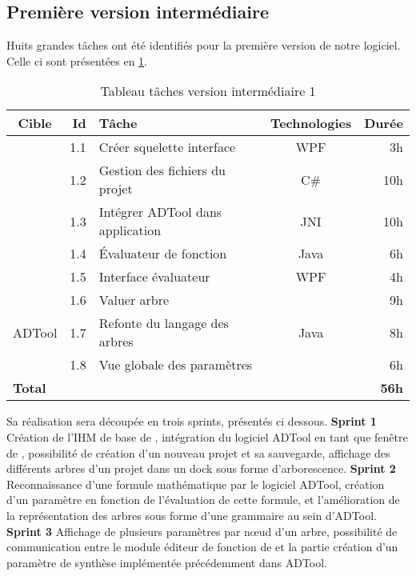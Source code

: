 	\subsection{Première version intermédiaire}
		Huits grandes tâches ont été identifiés pour la première version de notre logiciel. Celle ci sont présentées en \ttable{} \ref{tab:taches_units_1}. 
		\begin{table}[H]
			\centering
			\begin{tabular}{|c|r|l|c|r|}
				\hline
				\textbf{Cible} & \textbf{Id} & \textbf{Tâche} & \textbf{Technologies} & \textbf{Durée}\\
				\hline

				\multirow{5}{*}{\glasir{}} & 1.1 & Créer squelette interface & WPF & 3h\\
				\cline{2-5}
				 & 1.2 & Gestion des fichiers du projet & C\# & 10h\\
				\cline{2-5}
				 & 1.3 & Intégrer ADTool dans application & JNI & 10h\\
				\cline{2-5}
				 & 1.4 & \'Evaluateur de fonction & Java & 6h\\
				\cline{2-5}
				 & 1.5 & Interface évaluateur & WPF & 4h\\
				\hline

				\multirow{3}{*}{ADTool} & 1.6 & Valuer arbre & \multirow{3}{*}{Java} & 9h\\
				\cline{2-3} \cline{5-5}
				 & 1.7 & Refonte du langage des arbres & & 8h\\
				\cline{2-3} \cline{5-5}
				 & 1.8 & Vue globale des paramètres & & 6h\\
				\hline

				\multicolumn{4}{|l|}{\bf Total} & {\bf 56h}\\
				\hline
			\end{tabular}
			\caption{Tableau tâches version intermédiaire 1}
			\label{tab:taches_units_1}
		\end{table}
		Sa réalisation sera découpée en trois sprints, présentés ci dessous.\newline
		\textbf{Sprint 1} Création de l'IHM de base de \glasir{}, intégration du logiciel ADTool en tant que fenêtre de \glasir{}, possibilité de création d'un nouveau projet et sa sauvegarde, affichage des différents arbres d'un projet dans un dock sous forme d'arborescence.\newline
		\textbf{Sprint 2} Reconnaissance d'une formule mathématique par le logiciel ADTool, création d'un paramètre en fonction de l'évaluation de cette formule, et l'amélioration de la représentation des arbres sous forme d'une grammaire au sein d'ADTool.\newline
		\textbf{Sprint 3} Affichage de plusieurs paramètres par nœud d'un arbre, possibilité de communication entre le module éditeur de fonction de \glasir{} et la partie création d'un paramètre de synthèse implémentée précédemment dans ADTool.\newline


